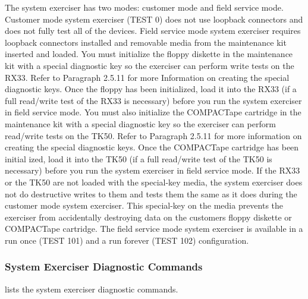 The system exerciser has two modes: customer mode and field service
mode. Customer mode system exerciser (TEST 0) does not use loopback
connectors and does not fully test all of the devices. Field service mode system 
exerciser requires loopback connectors installed and removable media
from the maintenance kit inserted and loaded. You must initialize the floppy
diskette in the maintenance kit with a special diagnostic key so the exerciser
can perform write tests on the RX33. Refer to Paragraph 2.5.11 for more
Information on creating the special diagnostic keys. Once the floppy has
been initialized, load it into the RX33 (if a full read/write test of the RX33 is
necessary) before you run the system exerciser in field service mode. You
must also initialize the COMPACTape cartridge in the maintenance kit with
a special diagnostic key so the exerciser can perform read/write tests on
the TK50. Refer to Paragraph 2.5.11 for more information on creating the
special diagnostic keys. Once the COMPACTape cartridge has been initial
ized, load it into the TK50 (if a full read/write test of the TK50 is necessary)
before you run the system exerciser in field service mode. If the RX33 or
the TK50 are not loaded with the special-key media, the system exerciser
does not do destructive writes to them and tests them the same as it does
during the customer mode system exerciser. This special-key on the media
prevents the exerciser from accidentally destroying data on the customers
floppy diskette or COMPACTape cartridge. The field service mode system
exerciser is available in a run once (TEST 101) and a run forever (TEST 102)
configuration.

\newpage

\subsubsection{System Exerciser Diagnostic Commands}
 lists the system exerciser diagnostic commands.

